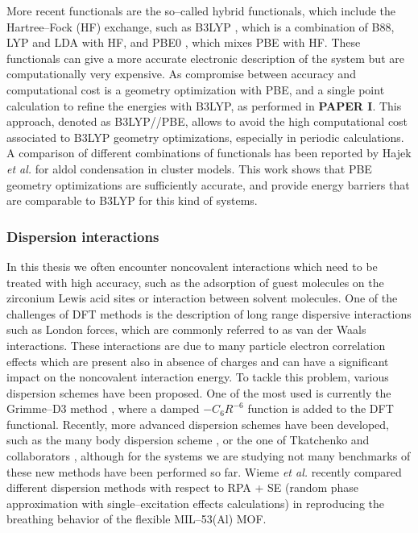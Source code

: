  More recent functionals are the so--called hybrid functionals, which include the Hartree--Fock (HF) exchange, such as B3LYP \cite{Becke1988, Becke1993, Lee1988}, which is a combination of B88, LYP and LDA with HF, and PBE0 \cite{Adamo1999}, which mixes PBE with HF. These functionals can give a more accurate electronic description of the system but are computationally very expensive. As compromise between accuracy and computational cost is a geometry optimization with PBE, and a single point calculation to refine the energies with B3LYP, as performed in \textbf{PAPER I}. This approach, denoted as B3LYP//PBE, allows to avoid the high computational cost associated to B3LYP geometry optimizations, especially in periodic calculations. A comparison of different combinations of functionals has been reported by Hajek \textit{et al.} \cite{hajek2015mechanistic} for aldol condensation in cluster models. This work shows that PBE geometry optimizations are sufficiently accurate, and provide energy barriers that are comparable to B3LYP for this kind of systems.

\subsubsection*{Dispersion interactions}
In this thesis we often encounter noncovalent interactions which need to be treated with high accuracy, such as the adsorption of guest molecules on the zirconium Lewis acid sites or interaction between solvent molecules. One of the challenges of DFT methods is the description of long range dispersive interactions such as London forces, which are commonly referred to as van der Waals interactions. These interactions are due to many particle electron correlation effects which are present also in absence of charges and can have a significant impact on the noncovalent interaction energy. 
To tackle this problem, various dispersion schemes have been proposed. One of the most used is currently the Grimme--D3 method \cite{Grimme2010}, where a damped $-C_{6}R^{-6}$ function is added to the DFT functional. Recently, more advanced dispersion schemes have been developed, such as the many body dispersion scheme \cite{Buko2016}, or the one of Tkatchenko and collaborators \cite{Ambrosetti2014}, although for the systems we are studying not many benchmarks of these new methods have been performed so far. 
Wieme \textit{et al.} \cite{wieme2018tuning} recently compared different dispersion methods with respect to RPA + SE (random phase approximation with single--excitation effects calculations) in reproducing the breathing behavior of the flexible MIL--53(Al) MOF. 

